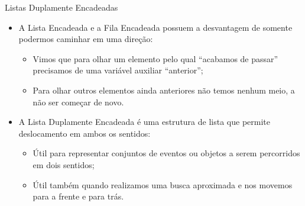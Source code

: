 \documentclass[12pt,table,xcolor={dvipsnames}]{beamer}
\begin{document}
\begin{frame}[fragile]{Listas Duplamente Encadeadas}
\begin{itemize}
\item A Lista Encadeada e a Fila Encadeada possuem a desvantagem de somente podermos caminhar em uma direção:
\begin{itemize}
\item Vimos que para olhar um elemento pelo qual ``acabamos de passar'' precisamos de uma variável auxiliar ``anterior'';
\item Para olhar outros elementos ainda anteriores não temos nenhum meio, a não ser começar de novo.
\end{itemize}
\item A Lista Duplamente Encadeada é uma estrutura de lista que permite deslocamento em ambos os sentidos:
\begin{itemize}
\item Útil para representar conjuntos de eventos ou objetos a serem percorridos em dois sentidos;
\item Útil também quando realizamos uma busca aproximada e nos movemos para a frente e para trás.
\end{itemize}
\end{itemize}
\end{frame}
\end{document}
